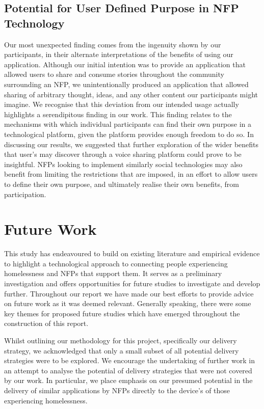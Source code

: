 \subsection{Potential for User Defined Purpose in NFP Technology}

Our most unexpected finding comes from the ingenuity shown by our participants, in their alternate interpretations of the benefits of using our application. Although our initial intention was to provide an application that allowed users to share and consume stories throughout the community surrounding an NFP, we unintentionally produced an application that allowed sharing of arbitrary thought, ideas, and any other content our participants might imagine. We recognise that this deviation from our intended usage actually highlights a serendipitous finding in our work. This finding relates to the mechanisms with which individual participants can find their own purpose in a technological platform, given the platform provides enough freedom to do so. In discussing our results, we suggested that further exploration of the wider benefits that user's may discover through a voice sharing platform could prove to be insightful. NFPs looking to implement similarly social technologies may also benefit from limiting the restrictions that are imposed, in an effort to allow users to define their own purpose, and ultimately realise their own benefits, from participation.

\section{Future Work}

This study has endeavoured to build on existing literature and empirical evidence to highlight a technological approach to connecting people experiencing homelessness and NFPs that support them. It serves as a preliminary investigation and offers opportunities for future studies to investigate and develop further. Throughout our report we have made our best efforts to provide advice on future work as it was deemed relevant. Generally speaking, there were some key themes for proposed future studies which have emerged throughout the construction of this report.

Whilst outlining our methodology for this project, specifically our delivery strategy, we acknowledged that only a small subset of all potential delivery strategies were to be explored. We encourage the undertaking of further work in an attempt to analyse the potential of delivery strategies that were not covered by our work. In particular, we place emphasis on our presumed potential in the delivery of similar applications by NFPs directly to the device's of those experiencing homelessness.

